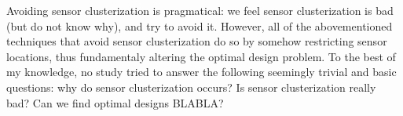 Avoiding sensor clusterization is pragmatical: we feel sensor
clusterization is bad (but do not know why), and try to avoid
it. However, all of the abovementioned techniques that avoid sensor
clusterization do so by somehow restricting sensor locations, thus
fundamentaly altering the optimal design problem. To the best of my
knowledge, no study tried to answer the following seemingly trivial
and basic questions: why do sensor clusterization occurs? Is sensor
clusterization really bad? Can we find optimal designs BLABLA?









